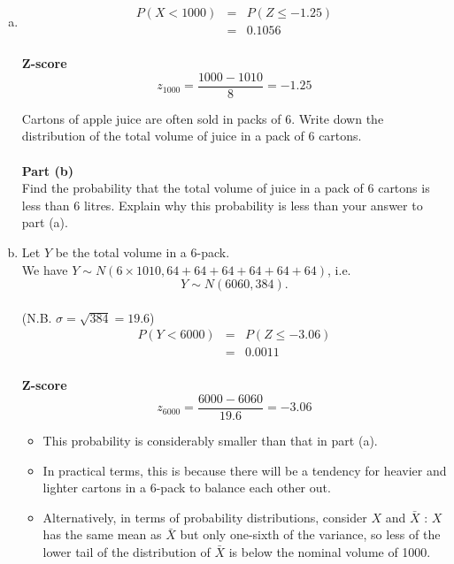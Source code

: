 \documentclass[a4paper,12pt]{article}
\begin{document}
\begin{enumerate}[(a)]
\item 

\begin{eqnarray*}
P(X <  1000) &=& P(Z \leq -1.25) \\
&=& 0.1056\\
\end{eqnarray*}

\begin{framed}
\noindent \textbf{Z-score}
\[z_{1000} = \frac{1000-1010}{8} = -1.25\]
\end{framed}
\newpage
\begin{framed}
\large
Cartons of apple juice are often sold in packs of 6.  Write down the distribution of the total volume of juice in a pack of 6 cartons.  \\ \\
\noindent \textbf{Part (b)}\\
\noindent Find the probability that the total volume of juice in a pack of 6 cartons is less than 6 litres.  Explain why this probability is less than your answer to part (a).
\end{framed}
\large
\item  Let $Y$ be the total volume in a 6-pack.\\
We have $Y \sim N(6 \times 1010, 64 + 64 + 64 + 64 + 64 + 64)$, i.e. \[Y \sim N(6060, 384).\] 
\\
(N.B. $\sigma = \sqrt{384} = 19.6$)
\begin{eqnarray*}
P(Y <  6000) &=& P(Z \leq -3.06) \\
&=& 0.0011\\
\end{eqnarray*}
\begin{framed}
\noindent \textbf{Z-score}
\[z_{6000} = \frac{6000-6060}{19.6 } = -3.06\]
\end{framed}

\begin{itemize}
    \item This probability is considerably smaller than that in part (a).
    \item In practical terms, this is
because there will be a tendency for heavier and lighter cartons in a 6-pack to balance
each other out. 
\item Alternatively, in terms of probability distributions, consider $X$ and $\bar{X}$ : $X$ has the same mean as $\bar{X}$ but only one-sixth of the variance, so less of the lower tail
of the distribution of $\bar{X}$ is below the nominal volume of 1000.
\end{itemize}
\newpage


\end{enumerate}
\end{document}

